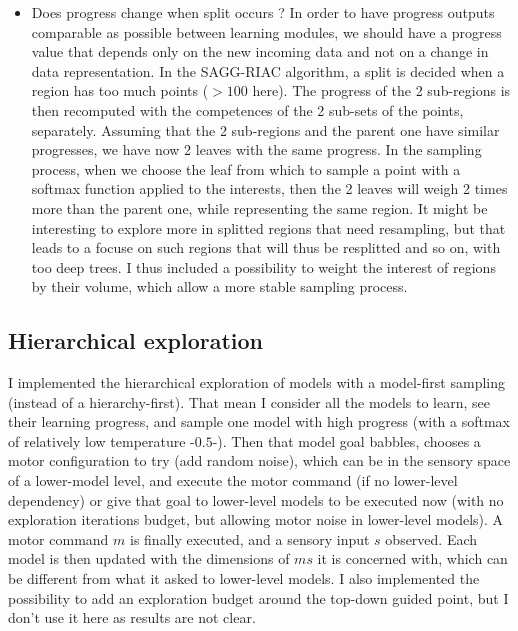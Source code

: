 \documentclass[12pt]{article}
\begin{document}
\begin{itemize}
			\item Does progress change when split occurs ? 
				In order to have progress outputs comparable as possible between learning modules, 
				we should have a progress value that depends only on the new incoming data and not on a change in data representation.
				In the SAGG-RIAC algorithm, a split is decided when a region has too much points ($>100$ here).
				The progress of the 2 sub-regions is then recomputed with the competences of the 2 sub-sets of the points, separately.
				Assuming that the 2 sub-regions and the parent one have similar progresses, we have now 2 leaves with the same progress.
				In the sampling process, when we choose the leaf from which to sample a point with a softmax function applied to the interests, then 
				the 2 leaves will weigh 2 times more than the parent one, while representing the same region. 
				It might be interesting to explore more in splitted regions that need resampling, but that leads to a focuse on such regions that will thus be resplitted and so on, with too deep trees. I thus included a possibility to weight the interest of regions by their volume, which allow
				a more stable sampling process.
				
				
		\end{itemize}
		
		
	
	
	\subsection{Hierarchical exploration}
	
		
		I implemented the hierarchical exploration of models with a model-first sampling (instead of a hierarchy-first).
		That mean I consider all the models to learn, see their learning progress, and sample one model with high progress 
		(with a softmax of relatively low temperature -$0.5$-). 
		Then that model goal babbles, chooses a motor configuration to try (add random noise), which can be in the sensory space of a lower-model level, 
		and execute the motor command (if no lower-level dependency) or give that goal to lower-level models to be executed now (with no exploration iterations budget, but allowing motor noise in lower-level models).
		A motor command $m$ is finally executed, and a sensory input $s$ observed.
		Each model is then updated with the dimensions of $ms$ it is concerned with, which can be different from what it asked to lower-level models.
		I also implemented the possibility to add an exploration budget around the top-down guided point, but I don't use it here as results are not clear.
		
\end{document}
